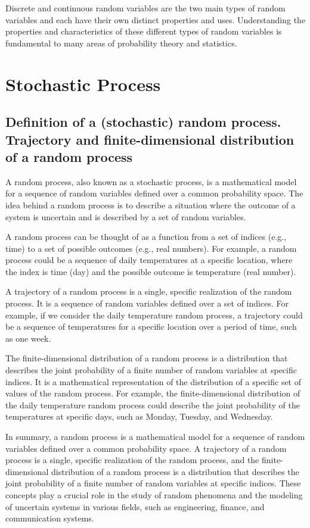 \documentclass[12pt, a4paper, oneside]{article}
\begin{document}
Discrete and continuous random variables are the two main types of random variables and each have their own distinct properties and uses. Understanding the properties and characteristics of these different types of random variables is fundamental to many areas of probability theory and statistics.





\section{Stochastic Process  }
\subsection{ Definition of a (stochastic) random process. Trajectory and finite-dimensional distribution of a random process }
A random process, also known as a stochastic process, is a mathematical model for a sequence of random variables defined over a common probability space. The idea behind a random process is to describe a situation where the outcome of a system is uncertain and is described by a set of random variables.

A random process can be thought of as a function from a set of indices (e.g., time) to a set of possible outcomes (e.g., real numbers). For example, a random process could be a sequence of daily temperatures at a specific location, where the index is time (day) and the possible outcome is temperature (real number).

A trajectory of a random process is a single, specific realization of the random process. It is a sequence of random variables defined over a set of indices. For example, if we consider the daily temperature random process, a trajectory could be a sequence of temperatures for a specific location over a period of time, such as one week.

The finite-dimensional distribution of a random process is a distribution that describes the joint probability of a finite number of random variables at specific indices. It is a mathematical representation of the distribution of a specific set of values of the random process. For example, the finite-dimensional distribution of the daily temperature random process could describe the joint probability of the temperatures at specific days, such as Monday, Tuesday, and Wednesday.

In summary, a random process is a mathematical model for a sequence of random variables defined over a common probability space. A trajectory of a random process is a single, specific realization of the random process, and the finite-dimensional distribution of a random process is a distribution that describes the joint probability of a finite number of random variables at specific indices. These concepts play a crucial role in the study of random phenomena and the modeling of uncertain systems in various fields, such as engineering, finance, and communication systems.
\end{document}

